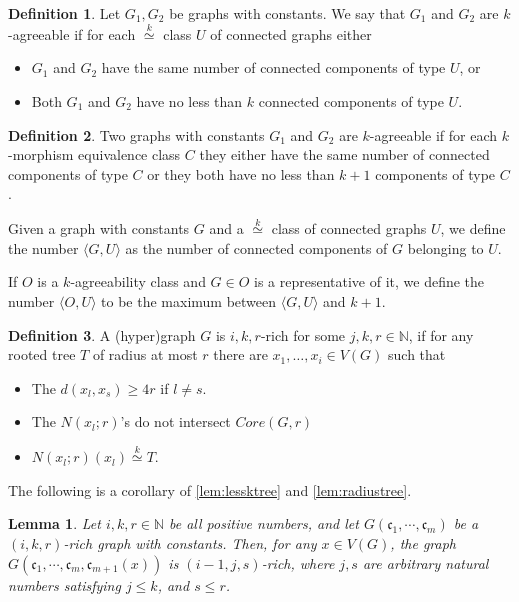 \documentclass[11pt,notitlepage]{report}
\newtheorem{lemma}{Lemma}[chapter]
\theoremstyle{definition}
\newtheorem{definition}{Definition}[chapter]
\newcommand{\cc}{\mathfrak{c}}
\newcommand{\N}{\mathbb{N}}
\newcommand{\clist}{\mathfrak{c}_{1}, \cdots, \mathfrak{c}_m}
\newcommand{\morph}[1]{\stackrel{#1}{\simeq}}
\begin{document}
\begin{definition}
	Let $G_1,G_2$ be graphs with constants. We say that $G_1$ and $G_2$ are
	$k$-agreeable if for each $\morph{k}$ class $U$ of connected graphs either
	\begin{itemize}
		\item $G_1$ and $G_2$ have the same number of connected components of type $U$, or
		\item Both $G_1$ and $G_2$ have no less than $k$ connected components of type $U$.
	\end{itemize} 
\end{definition}


\begin{definition} 
	Two graphs with constants $G_1$ and $G_2$ are $k$-agreeable if for each $k$-morphism 
	equivalence class $C$ they either have the same number of connected components of type
	$C$ or they both have no less than $k+1$ components of type $C$. 
\end{definition}

Given a graph with constants $G$ and a $\morph{k}$ class of connected
graphs $U$, we define the number $\langle G, U \rangle$ as the number
of connected components of $G$ belonging to $U$. \par
If $O$ is a $k$-agreeability class and $G\in O$ is a
representative of it, we define the number $\langle O, U \rangle$ to
be the maximum between $\langle G,U \rangle$ and $k+1$.

\begin{definition}
	A (hyper)graph $G$ is $i,k,r$-rich for some $j,k,r\in \N$, if for any rooted tree $T$
	of radius at most $r$ there are $x_1,\dots,x_i\in V(G)$ such that
	\begin{itemize}
		\item The $d(x_l,x_s)\geq 4r$ if $l\neq s$.
		\item The $N(x_l;r)$'s do not intersect $Core(G,r)$
		\item $N(x_l;r)(x_l) \morph{k} T$.		
	\end{itemize} 
\end{definition}

The following is a corollary of \cref{lem:lessktree} and \cref{lem:radiustree}.

\begin{lemma} \label{lemm:rich}
	Let $i,k,r\in \N$ be all positive numbers, and let $G(\clist)$
	be a $(i,k,r)$-rich graph with constants. Then, for any $x\in V(G)$,
	the graph $G(\clist, \cc_{m+1}(x))$ is $(i-1,j,s)$-rich, 
	where $j,s$ are arbitrary natural numbers satisfying $j\leq k$,
	and $s\leq r$.
\end{lemma}
\end{document}
